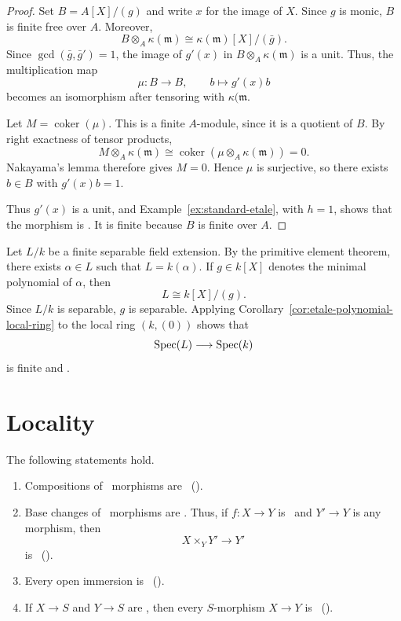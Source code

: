 \begin{proof}
	Set $B=A[X]/(g)$ and write $x$ for the image of $X$.
	Since $g$ is monic, $B$ is finite free over $A$.
	Moreover,
	\[
	B\otimes_A\kappa(\mathfrak{m})\cong\kappa(\mathfrak{m})[X]/(\bar g).
	\]
	Since $\gcd(\bar g,\bar g')=1$, the image of $g'(x)$
	in $B\otimes_A\kappa(\mathfrak{m})$ is a unit. Thus, the
	multiplication map
	\[
	\mu:B\longrightarrow B,\qquad
	b\longmapsto g'(x)b
	\]
	becomes an isomorphism after tensoring with $\kappa(\mathfrak{m}$.
	
	Let $M=\operatorname{coker}(\mu)$.
	This is a finite $A$-module, since it is a quotient
	of $B$. By right exactness of tensor products,
	\[
	M\otimes_A\kappa(\mathfrak{m})
	\cong\operatorname{coker}(\mu\otimes_A\kappa(\mathfrak{m}))
	=0.
	\]
	Nakayama's lemma therefore gives $M=0$.
	Hence $\mu$ is surjective, so there exists $b\in B$
	with $g'(x)b=1$.
	
	Thus $g'(x)$ is a unit, and
	Example~\ref{ex:standard-etale}, with $h=1$,
	shows that the morphism is \etale.
	It is finite because $B$ is finite over $A$.
\end{proof}

\begin{example}
	\label{ex:finite-separable-etale}
	Let $L/k$ be a finite separable field extension.
	By the primitive element theorem, there exists
	$\alpha\in L$ such that $L=k(\alpha)$.
	If $g\in k[X]$ denotes the minimal polynomial of
	$\alpha$, then
	\[
	L\cong k[X]/(g).
	\]
	Since $L/k$ is separable, $g$ is separable.
	Applying Corollary~\ref{cor:etale-polynomial-local-ring}
	to the local ring $(k, (0))$ shows that
	\[
	\operatorname{Spec}\!\left(L\right)\longrightarrow\operatorname{Spec}\!\left(k\right)
	\]
	is finite and \etale.
\end{example}


\section{Locality}


\begin{lemma}
	\label{lem:etale-permanence}
	The following statements hold.
	\begin{enumerate}
		\item Compositions of \etale\ morphisms are
		\etale\
		(\cite[][Tag 02GN]{stacks-project}).
		\item Base changes of \etale\ morphisms are
		\etale. Thus, if $f:X\to Y$ is \etale\ and
		$Y'\to Y$ is any morphism, then
		\[
		X\times_Y Y'\longrightarrow Y'
		\]
		is \etale\
		(\cite[][Tag 02GO]{stacks-project}).
		\item Every open immersion is \etale\
		(\cite[][Tag 02GP]{stacks-project}).
		\item If $X\to S$ and $Y\to S$ are \etale,
		then every $S$-morphism $X\to Y$ is \etale\
		(\cite[][Tag 02GW]{stacks-project}).
	\end{enumerate}
\end{lemma}

